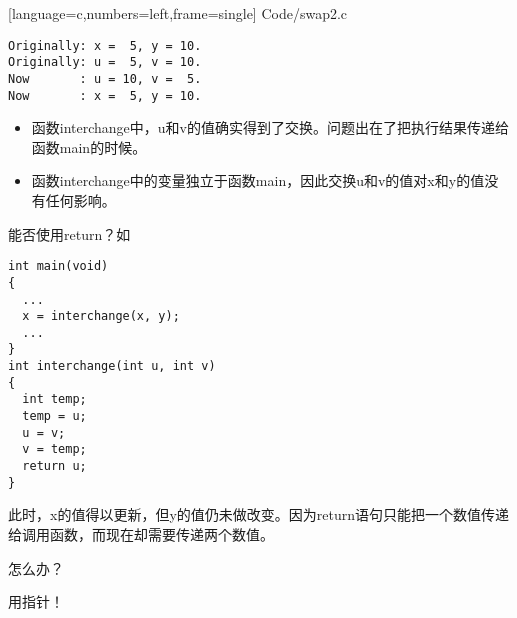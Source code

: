 \begin{frame}\ft{\secname}
  
  [language=c,numbers=left,frame=single]
  {Code/swap2.c}
\end{frame}

\begin{frame}[fragile]\ft{\secname}
\begin{lstlisting}[backgroundcolor=\color{red!10}]
Originally: x =  5, y = 10.
Originally: u =  5, v = 10.
Now       : u = 10, v =  5.
Now       : x =  5, y = 10.
\end{lstlisting}
\pause \vspace{0.1in}

\begin{itemize}
\item
函数interchange中，u和v的值确实得到了交换。问题出在了把执行结果传递给函数main的时候。\\[0.1in]
\item
函数interchange中的变量独立于函数main，因此交换u和v的值对x和y的值没有任何影响。
\end{itemize}

\end{frame}

\begin{frame}[fragile]\ft{\secname}
能否使用return？如
\begin{lstlisting}[backgroundcolor=\color{red!10}]
int main(void)
{
  ...
  x = interchange(x, y);
  ...
}
int interchange(int u, int v)
{
  int temp;
  temp = u;
  u = v;
  v = temp;
  return u;
}
\end{lstlisting}
\end{frame}

\begin{frame}[fragile]\ft{\secname}
此时，x的值得以更新，但y的值仍未做改变。因为\textcolor{acolor1}{return语句只能把一个数值传递给调用函数}，而现在却需要传递两个数值。
\pause \vspace{0.1in}

\begin{center}
{\Large 怎么办？}
\end{center}
\pause\vspace{0.1in}

\begin{center}
{\Large 用指针！} 
\end{center}
\end{frame}
